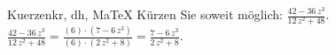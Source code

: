 \begin{MAufgabe}{Kuerzen}{kr, dh, MaTeX}
K\"urzen Sie soweit m\"oglich: $\frac{42 - 36\, z^3}{12\, z^2 + 48}$.\\ 
\ifLsg\MLoesung
\quad $\frac{42 - 36\, z^3}{12\, z^2 + 48}=\frac{(6)\cdot(7 - 6\, z^3)}{(6)\cdot(2\, z^2 + 8)}=\frac{7 - 6\, z^3}{2\, z^2 + 8}$.\else\relax\fi
 \end{MAufgabe}